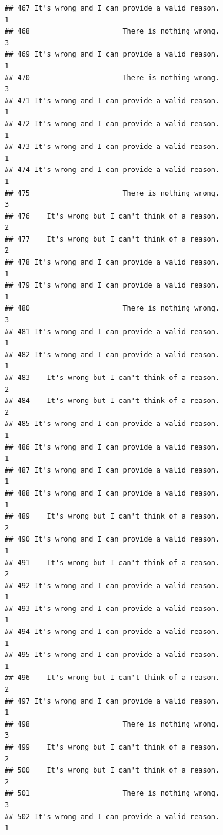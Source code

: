 \documentclass[
  american,
  man,floatsintext]{apa7}
\begin{document}
\begin{verbatim}
## 467 It's wrong and I can provide a valid reason.                    1
## 468                      There is nothing wrong.                    3
## 469 It's wrong and I can provide a valid reason.                    1
## 470                      There is nothing wrong.                    3
## 471 It's wrong and I can provide a valid reason.                    1
## 472 It's wrong and I can provide a valid reason.                    1
## 473 It's wrong and I can provide a valid reason.                    1
## 474 It's wrong and I can provide a valid reason.                    1
## 475                      There is nothing wrong.                    3
## 476    It's wrong but I can't think of a reason.                    2
## 477    It's wrong but I can't think of a reason.                    2
## 478 It's wrong and I can provide a valid reason.                    1
## 479 It's wrong and I can provide a valid reason.                    1
## 480                      There is nothing wrong.                    3
## 481 It's wrong and I can provide a valid reason.                    1
## 482 It's wrong and I can provide a valid reason.                    1
## 483    It's wrong but I can't think of a reason.                    2
## 484    It's wrong but I can't think of a reason.                    2
## 485 It's wrong and I can provide a valid reason.                    1
## 486 It's wrong and I can provide a valid reason.                    1
## 487 It's wrong and I can provide a valid reason.                    1
## 488 It's wrong and I can provide a valid reason.                    1
## 489    It's wrong but I can't think of a reason.                    2
## 490 It's wrong and I can provide a valid reason.                    1
## 491    It's wrong but I can't think of a reason.                    2
## 492 It's wrong and I can provide a valid reason.                    1
## 493 It's wrong and I can provide a valid reason.                    1
## 494 It's wrong and I can provide a valid reason.                    1
## 495 It's wrong and I can provide a valid reason.                    1
## 496    It's wrong but I can't think of a reason.                    2
## 497 It's wrong and I can provide a valid reason.                    1
## 498                      There is nothing wrong.                    3
## 499    It's wrong but I can't think of a reason.                    2
## 500    It's wrong but I can't think of a reason.                    2
## 501                      There is nothing wrong.                    3
## 502 It's wrong and I can provide a valid reason.                    1

\end{verbatim}
\end{document}
